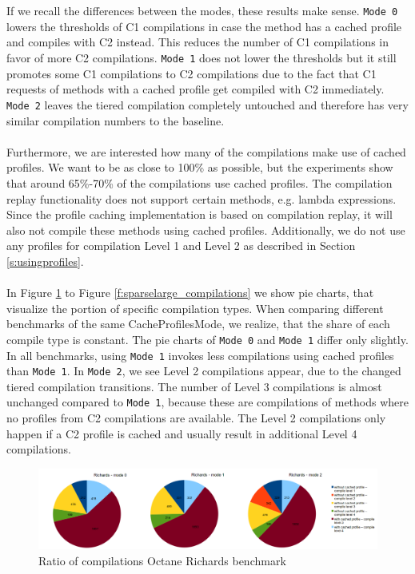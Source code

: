 \\\\
If we recall the differences between the modes, these results make sense. \texttt{Mode 0} lowers the thresholds of C1 compilations in case the method has a cached profile and compiles with C2 instead. This reduces the number of C1 compilations in favor of more C2 compilations. \texttt{Mode 1} does not lower the thresholds but it still promotes some C1 compilations to C2 compilations due to the fact that C1 requests of methods with a cached profile get compiled with C2 immediately.
\texttt{Mode 2} leaves the tiered compilation completely untouched and therefore has very similar compilation numbers to the baseline.
\\\\
Furthermore, we are interested how many of the compilations make use of cached profiles. We want to be as close to 100\% as possible, but the experiments show that around 65\%-70\% of the compilations use cached profiles.
The compilation replay functionality does not support certain methods, e.g. lambda expressions. Since the profile caching implementation is based on compilation replay, it will also not compile these methods using cached profiles. 
Additionally, we do not use any profiles for compilation Level 1 and Level 2 as described in Section \ref{s:usingprofiles}.
\\\\
In Figure \ref{f:richards_compilations} to Figure \ref{f:sparselarge_compilations} we show pie charts, that visualize the portion of specific compilation types.
When comparing different benchmarks of the same CacheProfilesMode, we realize, that the share of each compile type is constant.
The pie charts of \texttt{Mode 0} and \texttt{Mode 1} differ only slightly. In all benchmarks, using \texttt{Mode 1} invokes less compilations using cached profiles than \texttt{Mode 1}.
In \texttt{Mode 2}, we see Level 2 compilations appear, due to the changed tiered compilation transitions. The number of Level 3 compilations is almost unchanged compared to \texttt{Mode 1}, because these are compilations of methods where no profiles from C2 compilations are available.
The Level 2 compilations only happen if a C2 profile is cached and usually result in additional Level 4 compilations. 
\begin{figure}[ht]
  \begin{center}
    \centering
    \includegraphics[width=1.0\textwidth]{figures/richards_compilations.png}
    \caption{Ratio of compilations Octane Richards benchmark}
    \label{f:richards_compilations}
  \end{center}
\end{figure}
